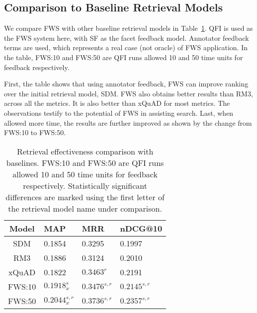 \subsection{Comparison to Baseline Retrieval Models}
\label{sec:ex-rms}
We compare FWS with other baseline retrieval models in Table~\ref{fig:cmp-other}. QFI is used as the FWS system here, with SF as the facet feedback model. Annotator feedback terms are used, which represents a real case (not oracle) of FWS application. 
In the table, FWS:10 and FWS:50 are QFI runs allowed 10 and 50 time units for feedback respectively. 

First, the table shows that using annotator feedback, FWS can improve ranking over the initial retrieval model, SDM. FWS also obtains better results than RM3, across all the metrics. It is also better than xQuAD for most metrics. The observations testify to the potential of FWS in assisting search. Last, when allowed more time, the results are further improved as shown by the change from FWS:10 to FWS:50.

\begin{table}[!ht]
\centering
\caption{Retrieval effectiveness comparison with baselines. FWS:10 and FWS:50 are QFI runs allowed 10 and 50 time units for feedback respectively. Statistically significant differences are marked using the first letter of the retrieval model name under comparison.}
\label{fig:cmp-other}
\begin{tabular}{|c|l|l|l|} \hline
Model & MAP & MRR & nDCG@10\\ \hline
SDM & 0.1854 & 0.3295 & 0.1997\\ \hline
RM3 & 0.1886 & 0.3124 & 0.2010\\ \hline
xQuAD & 0.1822 & $0.3463^{r}$ & 0.2191\\ \hline
FWS:10 & $0.1918^{s}_{x}$ & $0.3476^{s,r}$ & $0.2145^{s,r}$\\ \hline
FWS:50 & $0.2044^{s,r}_{x}$ & $0.3736^{s,r}$ & $0.2357^{s,r}$\\ \hline 

\end{tabular}
\end{table}

